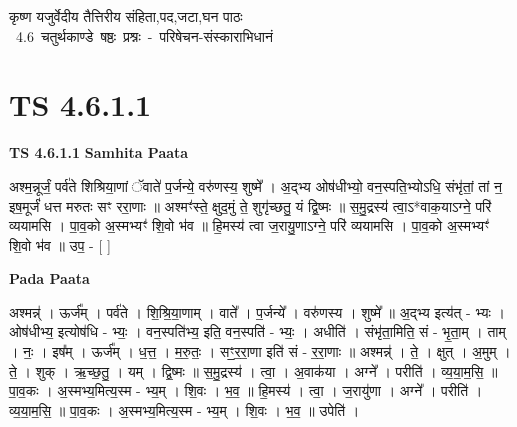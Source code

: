 \documentclass[17pt]{extarticle}
\begin{document}
\begin{titlepage}
    \begin{center}
 
\begin{sanskrit}
    { \Large
    कृष्ण यजुर्वेदीय तैत्तिरीय संहिता,पद,जटा,घन पाठः 
    }
    \\
    \vspace{2.5cm}
    \mbox{ \Large
    4.6      चतुर्थकाण्डे षष्ठः प्रश्नः - परिषेचन-संस्काराभिधानं   }
\end{sanskrit}
\end{center}

\end{titlepage}
\tableofcontents
{}
\pagebreak


\section{ TS 4.6.1.1 }

\textbf{TS 4.6.1.1 } \newline
\textbf{Samhita Paata} \newline

अश्म॒न्नूर्जं॒ पर्व॑ते शिश्रिया॒णां ॅवाते॑ प॒र्जन्ये॒ वरु॑णस्य॒ शुष्मे᳚ । अ॒द्भ्य ओष॑धीभ्यो॒ वन॒स्पति॒भ्योऽधि॒ संभृ॑तां॒ तां न॒ इष॒मूर्जं॑ धत्त मरुतः सꣳ ररा॒णाः ॥ अश्मꣳ॑स्ते॒ क्षुद॒मुं ते॒ शुगृ॑च्छतु॒ यं द्वि॒ष्मः ॥ स॒मु॒द्रस्य॑ त्वा॒ऽ*वाक॒याऽग्ने॒ परि॑ व्ययामसि । पा॒व॒को अ॒स्मभ्यꣳ॑ शि॒वो भ॑व ॥ हि॒मस्य॑ त्वा ज॒रायु॒णाऽग्ने॒ परि॑ व्ययामसि । पा॒व॒को अ॒स्मभ्यꣳ॑ शि॒वो भ॑व ॥ उप॒ - [  ] \newline

\textbf{Pada Paata} \newline

अश्मन्न्॑ । ऊर्ज᳚म् । पर्व॑ते । शि॒श्रि॒या॒णाम् । वाते᳚ । प॒र्जन्ये᳚ । वरु॑णस्य । शुष्मे᳚ ॥ अ॒द्भ्य इत्य॑त् - भ्यः । ओष॑धीभ्य॒ इत्योष॑धि - भ्यः॒ । वन॒स्पति॑भ्य॒ इति॒ वन॒स्पति॑ - भ्यः॒ । अधीति॑ । संभृ॑ता॒मिति॒ सं - भृ॒ता॒म् । ताम् । नः॒ । इष᳚म् । ऊर्ज᳚म् । ध॒त्त॒ । म॒रु॒तः॒ । सꣳ॒॒र॒रा॒णा इति॑ सं - र॒रा॒णाः ॥ अश्मन्न्॑ । ते॒ । क्षुत् । अ॒मुम् । ते॒ । शुक् । ऋ॒च्छ॒तु॒ । यम् । द्वि॒ष्मः ॥ स॒मु॒द्रस्य॑ । त्वा॒ । अ॒वाक॑या । अग्ने᳚ । परीति॑ । व्य॒या॒म॒सि॒ ॥ पा॒व॒कः । अ॒स्मभ्य॒मित्य॒स्म - भ्य॒म् । शि॒वः । भ॒व॒ ॥ हि॒मस्य॑ । त्वा॒ । ज॒रायु॑णा । अग्ने᳚ । परीति॑ । व्य॒या॒म॒सि॒ ॥ पा॒व॒कः । अ॒स्मभ्य॒मित्य॒स्म - भ्य॒म् । शि॒वः । भ॒व॒ ॥ उपेति॑ ।  \newline
\end{document}
